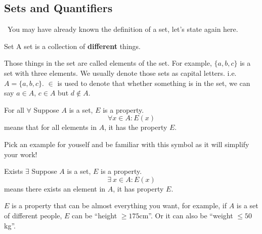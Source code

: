 \documentclass{article}
\begin{document}
\subsection{Sets and Quantifiers}
\quad\ You may have already known the definition of a set, let's state again here.
\begin{defin}{Set}
    A set is a collection of \textbf{different} things.
\end{defin}
Those things in the set are called elements of the set. For example, $\{a,b,c\}$ is a set with three elements. We
usually denote those sets as capital letters. i.e. $A = \{a,b,c\}$. $\in$ is used to denote that whether something is
in the set, we can say $a \in A$, $c \in A$ but $d \not\in A$.
\begin{defin}{For all $\forall$}
    Suppose $A$ is a set, $E$ is a property.
    $$\forall x\in A: E(x)$$
    means that for all elements in $A$, it has the property $E$.
\end{defin}
Pick an example for youself and be familiar with this symbol as it will simplify your work!
\begin{defin}{Exists $\exists$}
    Suppose $A$ is a set, $E$ is a property.
    $$\exists\ x\in A: E(x)$$
    means there exists an element in $A$, it has property $E$.
\end{defin}
$E$ is a property that can be almost everything you want, for example, if $A$ is a set of different people, $E$ can be ``height $\geq 175$cm''. Or
it can also be ``weight $\leq 50$kg''.\\
\end{document}
